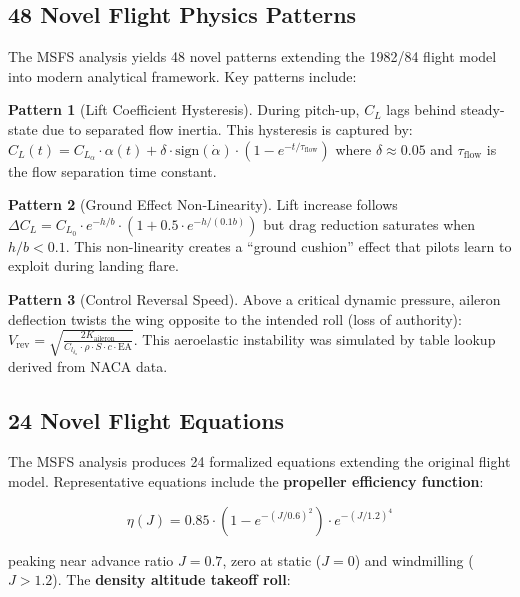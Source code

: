 \documentclass[11pt,a4paper]{article}
\theoremstyle{definition}
\newtheorem{pattern}{Pattern}[section]
\begin{document}
\subsection{48 Novel Flight Physics Patterns}

The MSFS analysis yields 48 novel patterns extending the 1982/84 flight model into modern analytical framework. Key patterns include:

\begin{pattern}[Lift Coefficient Hysteresis]
During pitch-up, $C_L$ lags behind steady-state due to separated flow inertia. This hysteresis is captured by: $C_L(t) = C_{L_\alpha}\cdot\alpha(t) + \delta\cdot\text{sign}(\dot{\alpha})\cdot(1-e^{-t/\tau_{\text{flow}}})$ where $\delta \approx 0.05$ and $\tau_{\text{flow}}$ is the flow separation time constant.
\end{pattern}

\begin{pattern}[Ground Effect Non-Linearity]
Lift increase follows $\Delta C_L = C_{L_0}\cdot e^{-h/b}\cdot(1+0.5\cdot e^{-h/(0.1b)})$ but drag reduction saturates when $h/b < 0.1$. This non-linearity creates a ``ground cushion'' effect that pilots learn to exploit during landing flare.
\end{pattern}

\begin{pattern}[Control Reversal Speed]
Above a critical dynamic pressure, aileron deflection twists the wing opposite to the intended roll (loss of authority): $V_{\text{rev}} = \sqrt{\frac{2K_{\text{aileron}}}{C_{l_{\delta_a}}\cdot\rho\cdot S\cdot c\cdot\text{EA}}}$. This aeroelastic instability was simulated by table lookup derived from NACA data.
\end{pattern}

\subsection{24 Novel Flight Equations}

The MSFS analysis produces 24 formalized equations extending the original flight model. Representative equations include the \textbf{propeller efficiency function}:

\begin{equation}\label{eq:msfs-prop}
\eta(J) = 0.85\cdot\left(1 - e^{-(J/0.6)^2}\right)\cdot e^{-(J/1.2)^4}
\end{equation}

peaking near advance ratio $J = 0.7$, zero at static ($J=0$) and windmilling ($J>1.2$). The \textbf{density altitude takeoff roll}:
\end{document}
